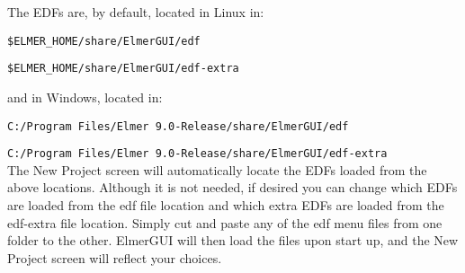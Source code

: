 \noindent The EDFs are, by default, located in Linux in:

\texttt{\$ELMER\_HOME/share/ElmerGUI/edf}

\texttt{\$ELMER\_HOME/share/ElmerGUI/edf-extra}

\noindent and in Windows, located in:

\texttt{C:/Program Files/Elmer 9.0-Release/share/ElmerGUI/edf}

\texttt{C:/Program Files/Elmer 9.0-Release/share/ElmerGUI/edf-extra}\\

The New Project screen will automatically locate the EDFs loaded from the above locations.  Although it is not needed, if desired you can change which EDFs are loaded from the edf file location and which extra EDFs are loaded from the edf-extra file location.  Simply cut and paste any of the edf menu files from one folder to the other.   ElmerGUI will then load the files upon start up, and the New Project screen will reflect your choices.


